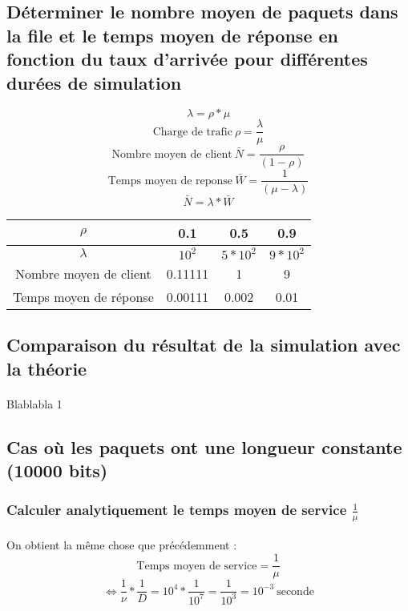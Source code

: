         \subsection{Déterminer le nombre moyen de paquets dans la file et le temps moyen de réponse en fonction du taux d'arrivée pour différentes durées de simulation}
\[  \lambda = \rho * \mu \]
\[  \text{Charge de trafic} \ \rho = \frac{\lambda}{\mu} \]
\[  \text{Nombre moyen de client} \ \bar{N} = \frac{\rho}{(1 - \rho)} \]
\[  \text{Temps moyen de reponse} \ \bar{W} = \frac{1}{(\mu - \lambda)} \]
\[  \bar{N} = \lambda * \bar{W} \]
\begin{center}
    \begin{tabular}{ | c | c| c | c | }
        \hline
            $\rho$ & 0.1 & 0.5 & 0.9 \\
        \hline
            $\lambda$ & $10^{2}$ & $5*10^{2}$ & $9*10^{2}$ \\
        \hline
            Nombre moyen de client & 0.11111 & 1 & 9 \\
        \hline
            Temps moyen de réponse & 0.00111 & 0.002 & 0.01 \\
        \hline
    \end{tabular}
\end{center}
%
        \subsection{Comparaison du résultat de la simulation avec la théorie}
            \paragraph{}
Blablabla 1
%
        \subsection{Cas où les paquets ont une longueur constante (10000 bits)}
%
            \subsubsection{Calculer analytiquement le temps moyen de service $\frac{1}{\mu}$}
%
                \paragraph{}
On obtient la même chose que précédemment :
\[  \text{Temps moyen de service} = \frac{1}{\mu} \]
\[ \iff \frac{1}{\nu} * \frac{1}{D} = 10^{4} * \frac{1}{10^{7}} = \frac{1}{10^{3}} = 10^{-3} \ \text{seconde} \]
%
